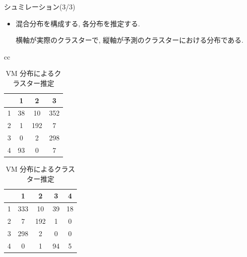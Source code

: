 \documentclass[dvipdfmx]{beamer}
\begin{document}
\begin{frame}{シュミレーション(3/3)}

\begin{itemize}

\item
混合分布を構成する, 各分布を推定する.

横軸が実際のクラスターで, 縦軸が予測のクラスターにおける分布である.

\end{itemize}

\begin{table}[H]
\begin{center}
\begin{tabular}{cc}

\begin{minipage}{0.5\hsize}
\begin{center}
\caption{PN 分布によるクラスター推定}
\begin{tabular}{c|c|c|c}
\hline
  & 1 & 2 & 3 \\ \hline \hline
1 & 38 & 10 & 352 \\
 2 & 1 & 192 & 7 \\
 3 & 0 & 2  & 298 \\
 4 & 93 & 0 & 7 \\
\hline
 \end{tabular}
 \end{center}
\end{minipage}

\begin{minipage}{0.5\hsize}
\begin{center}
\caption{VM 分布によるクラスター推定}
\begin{tabular}{c|c|c|c|c}
\hline
 & 1 & 2 & 3 & 4 \\ \hline \hline
1 & 333 & 10 & 39 & 18 \\
2 & 7 & 192 & 1 & 0 \\
3 & 298 & 2  & 0 & 0 \\
4 & 0 & 1 & 94 & 5 \\
\hline
\end{tabular}
\end{center}
\end{minipage}

\end{tabular}
\end{center}
\end{table}

\end{frame}
\end{document}
